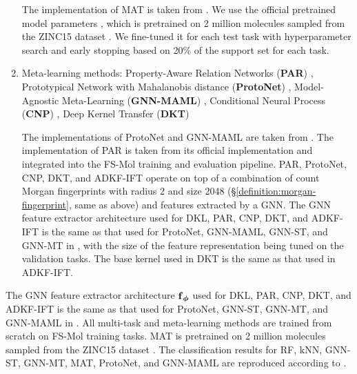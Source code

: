 \begin{enumerate}
                The implementation of MAT is taken from \citet{stanley2021fsmol}.
                We use the official pretrained model parameters \citep{maziarka2020molecule},
                which is pretrained on 2 million molecules sampled from the ZINC15 dataset
                \citep{sterling2015zinc}. We fine-tuned it for each test task with hyperparameter
                search and early stopping based on 20\% of the support set for each task.   
            \item Meta-learning methods: {Property-Aware Relation Networks (\textbf{PAR})} \citep{wang2021property},
                Prototypical Network with Mahalanobis distance (\textbf{ProtoNet}) \citep{snell2017prototypical},
                Model-Agnostic Meta-Learning (\textbf{GNN-MAML}) \citep{finn17a}, Conditional Neural Process (\textbf{CNP})
                \citep{garnelo18a}, Deep Kernel Transfer (\textbf{DKT}) \citep{Patacchiola20}

                The implementations of ProtoNet and GNN-MAML are taken from \citet{stanley2021fsmol}.
                The implementation of {\color{black}PAR} is taken from its official implementation and
                integrated into the FS-Mol training and evaluation pipeline. PAR, ProtoNet, CNP, DKT, and
                ADKF-IFT operate on top of a combination of
                count Morgan fingerprints with radius 2 and size 2048 (\S\ref{definition:morgan-fingerprint}, same as above)
                and features extracted by a GNN. The GNN feature extractor architecture used for DKL,
                {PAR}, CNP, DKT, and ADKF-IFT is the same as that used for ProtoNet,
                GNN-MAML, GNN-ST, and GNN-MT in \citet{stanley2021fsmol}, with the size of the feature
                representation being tuned on the validation tasks. The base kernel used in DKT is the
                same as that used in ADKF-IFT.
        \end{enumerate}
        The GNN feature extractor architecture $\operatorname{\mathbf{f}}_{\operatorname{\boldsymbol{\phi}}}$ used for DKL, {\color{black}PAR}, CNP, DKT, and ADKF-IFT
        is the same as that used for ProtoNet, GNN-ST, GNN-MT, and GNN-MAML in \citet{stanley2021fsmol}. 
        All multi-task and meta-learning methods are trained from scratch on FS-Mol training tasks.
        MAT is pretrained on 2 million molecules sampled from the ZINC15 dataset \citep{sterling2015zinc}.
        The classification results for RF, kNN, GNN-ST, GNN-MT, MAT, ProtoNet, and GNN-MAML are reproduced according to
        \citet{stanley2021fsmol}.
        
